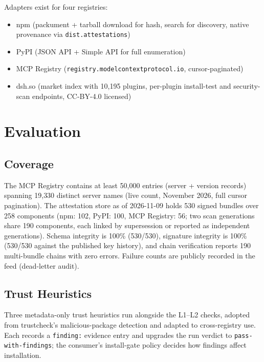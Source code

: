\documentclass[11pt,a4paper]{article}
\begin{document}
Adapters exist for four registries:
\begin{itemize}[leftmargin=1.5em]
\item npm (packument + tarball download for hash, search for discovery, native
provenance via \texttt{dist.attestations})
\item PyPI (JSON API + Simple API for full enumeration)
\item MCP Registry (\texttt{registry.modelcontextprotocol.io}, cursor-paginated)
\item dsh.so (market index with 10{,}195 plugins, per-plugin install-test and
security-scan endpoints, CC-BY-4.0 licensed)
\end{itemize}

\section{Evaluation}

\subsection{Coverage}

The MCP Registry contains at least 50{,}000 entries (server + version records) spanning 19{,}330 distinct server names (live count, November 2026, full cursor pagination). The attestation store as of 2026-11-09 holds 530 signed bundles over 258 components (npm: 102, PyPI: 100, MCP Registry: 56; two scan generations share 190 components, each linked by supersession or reported as independent generations). Schema integrity is 100\% (530/530), signature integrity is 100\% (530/530 against the published key history), and chain verification reports 190 multi-bundle chains with zero errors. Failure counts are publicly recorded in the feed (dead-letter audit).

\subsection{Trust Heuristics}

Three metadata-only trust heuristics run alongside the L1--L2 checks, adopted
from trustcheck's malicious-package detection and adapted to cross-registry
use. Each records a \texttt{finding:} evidence entry and upgrades the run
verdict to \texttt{pass-with-findings}; the consumer's install-gate policy
decides how findings affect installation.
\end{document}
